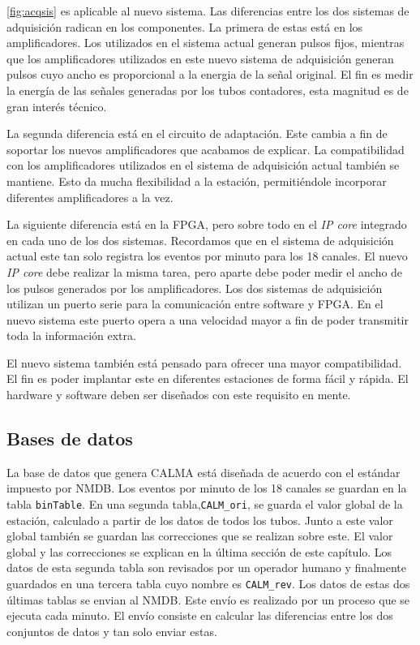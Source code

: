 		\ref{fig:acqsis} es aplicable al nuevo sistema. Las diferencias entre los dos sistemas de adquisición radican en los componentes. La
		primera de estas está en los amplificadores. Los utilizados en el sistema actual generan pulsos fijos, mientras que los amplificadores
		utilizados en este nuevo sistema de adquisición generan pulsos cuyo ancho es proporcional a la energia de la señal original. El fin es
		medir la energía de las señales generadas por los tubos contadores, esta magnitud es de gran interés técnico.
		\par
		La segunda diferencia está en el circuito de adaptación. Este cambia a fin de soportar los nuevos amplificadores que acabamos de
		explicar. La compatibilidad con los amplificadores utilizados en el sistema de adquisición actual también se mantiene. Esto da mucha
		flexibilidad a la estación, permitiéndole incorporar diferentes amplificadores a la vez.
		\par
		La siguiente diferencia está en la FPGA, pero sobre todo en el \emph{IP core} integrado en cada uno de los dos sistemas. Recordamos
		que en el sistema de adquisición actual este tan solo registra los eventos por minuto para los 18 canales. El nuevo \emph{IP core}
		debe realizar la misma tarea, pero aparte debe poder medir el ancho de los pulsos generados por los amplificadores. Los dos sistemas
		de adquisición utilizan un puerto serie para la comunicación entre software y FPGA. En el nuevo sistema este puerto opera a una
		velocidad mayor a fin de poder transmitir toda la información extra.
		\par
		El nuevo sistema también está pensado para ofrecer una mayor compatibilidad. El fin es poder implantar este en diferentes estaciones
		de forma fácil y rápida. El hardware y software deben ser diseñados con este requisito en mente.
	\subsection{Bases de datos}
		La base de datos que genera CALMA está diseñada de acuerdo con el estándar impuesto por NMDB. Los eventos por minuto de los 18 canales
		se guardan en la tabla \texttt{binTable}. En una segunda tabla,\texttt{CALM\_ori}, se guarda el valor global de la estación, calculado
		a partir de los datos de todos los tubos. Junto a este valor global también se guardan las correcciones que se realizan sobre este. El
		valor global y las correcciones se explican en la última sección de este capítulo. Los datos de esta segunda tabla son revisados
		por un operador humano y finalmente guardados en una tercera tabla cuyo nombre es \texttt{CALM\_rev}. Los datos de estas dos últimas
		tablas se envian al NMDB. Este envío es realizado por un proceso que se ejecuta cada minuto. El envío consiste en calcular las
		diferencias entre los dos conjuntos de datos y tan solo enviar estas.
